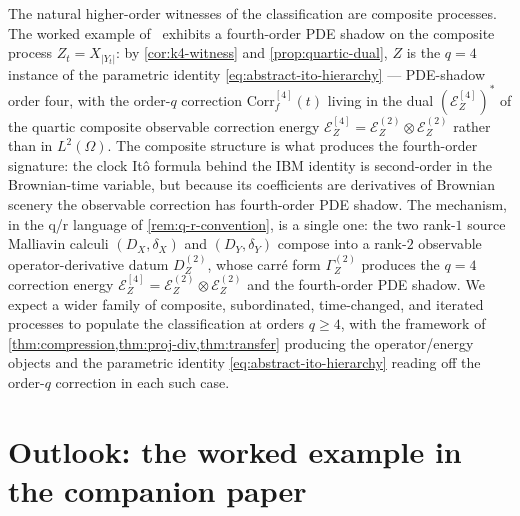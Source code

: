 \documentclass[11pt,reqno]{amsart}
\theoremstyle{plain}
\theoremstyle{definition}
\theoremstyle{remark}
\newcommand{\Energy}{\mathcal{E}}
\newcommand{\IBM}{Z}
\newcommand{\Carre}{\Gamma}
\begin{document}
The natural higher-order witnesses of the classification are
composite processes. The worked example of~\cite{IBMPaper} exhibits
a fourth-order PDE shadow on the composite process
$\IBM_t=X_{|Y_t|}$: by \cref{cor:k4-witness} and
\cref{prop:quartic-dual}, $\IBM$ is the $q=4$ instance of the
parametric identity \eqref{eq:abstract-ito-hierarchy} --- PDE-shadow
order four, with the order-$q$ correction
$\mathrm{Corr}_f^{[4]}(t)$ living in the dual
$(\Energy_\IBM^{[4]})^{*}$ of the quartic composite observable
correction energy
$\Energy_\IBM^{[4]}=\Energy_\IBM^{(2)}\otimes\Energy_\IBM^{(2)}$
rather than in $L^{2}(\Omega)$. The composite structure is what
produces the fourth-order signature: the clock It\^o formula behind
the IBM identity is second-order in the Brownian-time variable, but
because its coefficients are derivatives of Brownian scenery the
observable correction has fourth-order PDE shadow. The mechanism, in
the q/r language of \cref{rem:q-r-convention}, is a single one: the
two rank-$1$ source Malliavin calculi $(D_X,\delta_X)$ and
$(D_Y,\delta_Y)$ compose into a rank-$2$ observable operator-derivative
datum $D_\IBM^{(2)}$, whose carr\'e form $\Carre^{(2)}_\IBM$ produces
the $q=4$ correction energy
$\Energy_\IBM^{[4]}=\Energy_\IBM^{(2)}\otimes\Energy_\IBM^{(2)}$ and
the fourth-order PDE shadow. We expect a wider family of composite, subordinated,
time-changed, and iterated processes to populate the classification
at orders $q\ge 4$, with the framework of
\cref{thm:compression,thm:proj-div,thm:transfer} producing the
operator/energy objects and the parametric identity
\eqref{eq:abstract-ito-hierarchy} reading off the order-$q$
correction in each such case.

\section{Outlook: the worked example in the companion paper}\label{sec:outlook}
\end{document}

